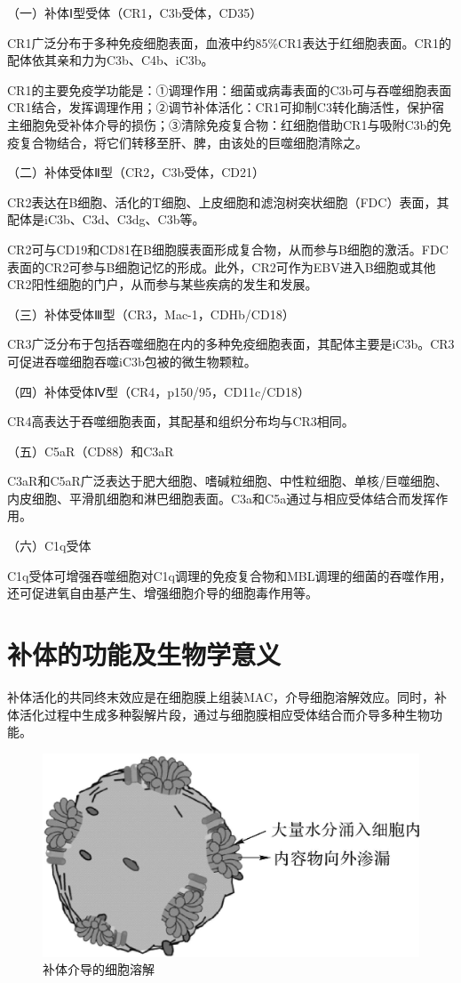 （一）补体Ⅰ型受体（CR1，C3b受体，CD35）

CR1广泛分布于多种免疫细胞表面，血液中约85\%CR1表达于红细胞表面。CR1的配体依其亲和力为C3b、C4b、iC3b。

CR1的主要免疫学功能是：①调理作用：细菌或病毒表面的C3b可与吞噬细胞表面CR1结合，发挥调理作用；②调节补体活化：CR1可抑制C3转化酶活性，保护宿主细胞免受补体介导的损伤；③清除免疫复合物：红细胞借助CR1与吸附C3b的免疫复合物结合，将它们转移至肝、脾，由该处的巨噬细胞清除之。

（二）补体受体Ⅱ型（CR2，C3b受体，CD21）

CR2表达在B细胞、活化的T细胞、上皮细胞和滤泡树突状细胞（FDC）表面，其配体是iC3b、C3d、C3dg、C3b等。

CR2可与CD19和CD81在B细胞膜表面形成复合物，从而参与B细胞的激活。FDC表面的CR2可参与B细胞记忆的形成。此外，CR2可作为EBV进入B细胞或其他CR2阳性细胞的门户，从而参与某些疾病的发生和发展。

（三）补体受体Ⅲ型（CR3，Mac-1，CDHb/CD18）

CR3广泛分布于包括吞噬细胞在内的多种免疫细胞表面，其配体主要是iC3b。CR3可促进吞噬细胞吞噬iC3b包被的微生物颗粒。

（四）补体受体Ⅳ型（CR4，p150/95，CD11c/CD18）

CR4高表达于吞噬细胞表面，其配基和组织分布均与CR3相同。

（五）C5aR（CD88）和C3aR

C3aR和C5aR广泛表达于肥大细胞、嗜碱粒细胞、中性粒细胞、单核/巨噬细胞、内皮细胞、平滑肌细胞和淋巴细胞表面。C3a和C5a通过与相应受体结合而发挥作用。

（六）C1q受体

C1q受体可增强吞噬细胞对C1q调理的免疫复合物和MBL调理的细菌的吞噬作用，还可促进氧自由基产生、增强细胞介导的细胞毒作用等。

\section{补体的功能及生物学意义}

补体活化的共同终末效应是在细胞膜上组装MAC，介导细胞溶解效应。同时，补体活化过程中生成多种裂解片段，通过与细胞膜相应受体结合而介导多种生物功能。

\begin{figure}[!htbp]
 \centering
 \includegraphics{./images/Image00087.jpg}
 \captionsetup{justification=centering}
 \caption{补体介导的细胞溶解}
 \label{fig5-9}
  \end{figure} 


